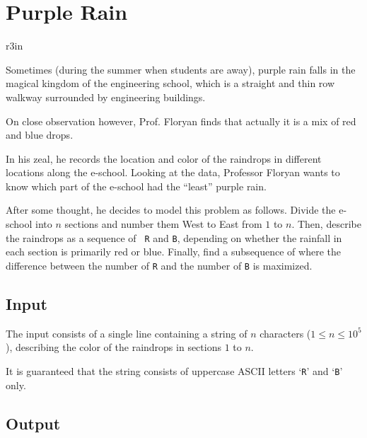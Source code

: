 \documentclass[11pt]{article}
\begin{document}
\section*{Purple Rain}

\begin{wrapfigure}{r}{3in}
\vspace{-10pt}
\vspace{-30pt}
\end{wrapfigure}

Sometimes (during the summer when students are away), purple rain falls in the magical kingdom of the engineering school, which is a straight and thin row walkway surrounded by engineering buildings.

On close observation however, Prof. Floryan finds that actually
it is a mix of red and blue drops.

In his zeal, he records the location and color of the raindrops in
different locations along the e-school.
Looking at the data, Professor Floryan wants to know which part of
the e-school had the ``least'' purple rain.

After some thought, he decides to model this problem as follows.
Divide the e-school into $n$ sections and number them West to East
from $1$ to $n$.  Then, describe the raindrops as a sequence of {\tt
R} and {\tt B}, depending on whether the rainfall in each section is
primarily red or blue.  Finally, find a subsequence of where the
difference between the number of {\tt R} and the number of {\tt B} is
maximized.

\subsection*{Input}

The input consists of a single line containing a string of $n$
characters ($1 \le n \le 10^5$), describing the color of the raindrops
in sections $1$ to $n$.

It is guaranteed that the string consists of uppercase ASCII letters
`{\tt R}' and `{\tt B}' only.

\subsection*{Output}
\end{document}

